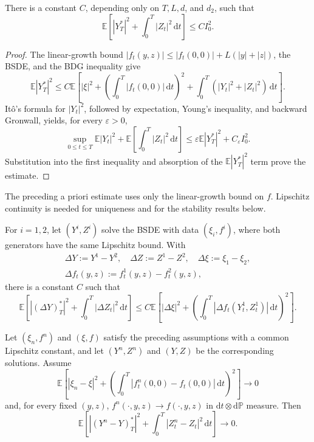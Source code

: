\begin{thm}
There is a constant $C$, depending only on $T,L,d$, and $d_2$, such that
\[
  \mathbb E\!\left[
    |Y_T^*|^2+\int_0^T|Z_t|^2\,\mathrm dt
  \right]
  \le C I_0^2.
\]
\end{thm}

\begin{proof}
The linear-growth bound
$|f_t(y,z)|\le |f_t(0,0)|+L(|y|+|z|)$, the BSDE, and the BDG inequality
give
\[
  \mathbb E|Y_T^*|^2
  \le C\mathbb E\!\left[
    |\xi|^2+\left(\int_0^T|f_t(0,0)|\,\mathrm dt\right)^2
    +\int_0^T(|Y_t|^2+|Z_t|^2)\,\mathrm dt
  \right].
\]
It\^o's formula for $|Y_t|^2$, followed by expectation, Young's
inequality, and backward Gronwall, yields, for every $\varepsilon>0$,
\[
  \sup_{0\le t\le T}\mathbb E|Y_t|^2
  +\mathbb E\!\left[\int_0^T|Z_t|^2\,\mathrm dt\right]
  \le \varepsilon\mathbb E|Y_T^*|^2+C_\varepsilon I_0^2.
\]
Substitution into the first inequality and absorption of the
$\mathbb E|Y_T^*|^2$ term prove the estimate.
\end{proof}

\begin{remark}
The preceding a priori estimate uses only the linear-growth bound on
$f$.  Lipschitz continuity is needed for uniqueness and for the stability
results below.
\end{remark}

\begin{cor}[Stability]
For $i=1,2$, let $(Y^i,Z^i)$ solve the BSDE with data $(\xi_i,f^i)$,
where both generators have the same Lipschitz bound.  With
\[
\begin{gathered}
  \Delta Y:=Y^1-Y^2,
  \quad \Delta Z:=Z^1-Z^2,
  \quad \Delta\xi:=\xi_1-\xi_2,\\
  \Delta f_t(y,z):=f_t^1(y,z)-f_t^2(y,z),
\end{gathered}
\]
there is a constant $C$ such that
\[
  \mathbb E\!\left[
    |(\Delta Y)_T^*|^2+\int_0^T|\Delta Z_t|^2\,\mathrm dt
  \right]
  \le C\mathbb E\!\left[
    |\Delta\xi|^2+
    \left(\int_0^T
      |\Delta f_t(Y_t^1,Z_t^1)|\,\mathrm dt
    \right)^2
  \right].
\]
\end{cor}

\begin{thm}
Let $(\xi_n,f^n)$ and $(\xi,f)$ satisfy the preceding assumptions with a
common Lipschitz constant, and let $(Y^n,Z^n)$ and $(Y,Z)$ be the
corresponding solutions.  Assume
\[
  \mathbb E\!\left[
    |\xi_n-\xi|^2+
    \left(\int_0^T|f_t^n(0,0)-f_t(0,0)|\,\mathrm dt\right)^2
  \right]\longrightarrow0
\]
and, for every fixed $(y,z)$,
$f^n(\cdot,y,z)\to f(\cdot,y,z)$ in
$\mathrm dt\otimes\mathrm d\mathbb P$ measure.  Then
\[
  \mathbb E\!\left[
    |(Y^n-Y)_T^*|^2+\int_0^T|Z_t^n-Z_t|^2\,\mathrm dt
  \right]\longrightarrow0.
\]
\end{thm}

